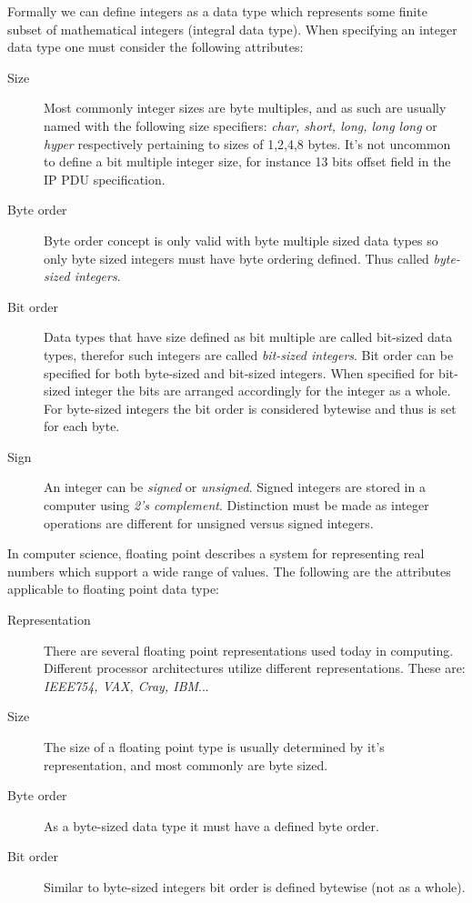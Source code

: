 \documentclass[times, utf8, diplomski]{fer}
\begin{document}
Formally we can define integers as a data type which represents some finite 
subset of mathematical integers (integral data type). When specifying an 
integer data type one must consider the following attributes:
\begin{description}
	\item[Size] Most commonly integer sizes are byte multiples, and as such are 
		usually named with the following size specifiers: \emph{char, short, long, long long} or 
		\emph{hyper} respectively pertaining to sizes of 1,2,4,8 bytes. It's not uncommon to 
		define a bit multiple integer size, for instance 13 bits offset field in the 
		IP PDU specification.
	\item[Byte order] Byte order concept is only valid with byte multiple sized 
		data types so only byte sized integers must have byte ordering defined.
		Thus called \emph{byte-sized integers}.
	\item[Bit order] Data types that have size defined as bit multiple are 
		called bit-sized data types, therefor such integers are called 
		\emph{bit-sized integers}. Bit order can be specified for both byte-sized 
		and bit-sized integers. When specified for bit-sized integer the bits are 
		arranged accordingly for the integer as a whole. For byte-sized integers 
		the bit order is considered bytewise and thus is set for each byte.	
	\item[Sign] An integer can be \emph{signed} or \emph{unsigned}. Signed integers
	are stored in a computer using \emph{2's complement}. Distinction must be made 
	as integer operations are different for unsigned versus	signed integers.
\end{description}

In computer science, floating point describes a system for representing real 
numbers which support a wide range of values. The following are the attributes 
applicable to floating point data type:
\begin{description}
	\item[Representation] There are several floating point representations used 
		today in computing. Different processor architectures utilize different 
		representations. These are: \emph{IEEE754, VAX, Cray, IBM}...
	\item[Size] The size of a floating point type is usually determined by it's 
		representation, and most commonly are byte sized.
	\item[Byte order] As a byte-sized data type it must have a defined byte order.
	\item[Bit order] Similar to byte-sized integers bit order is defined bytewise 
		(not as a whole).
\end{description}
\end{document}
